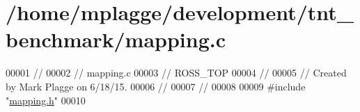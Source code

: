 \hypertarget{mapping_8c_source}{}\section{/home/mplagge/development/tnt\+\_\+benchmark/mapping.c}

\begin{DoxyCode}
00001 \textcolor{comment}{//}
00002 \textcolor{comment}{//  mapping.c}
00003 \textcolor{comment}{//  ROSS\_TOP}
00004 \textcolor{comment}{//}
00005 \textcolor{comment}{//  Created by Mark Plagge on 6/18/15.}
00006 \textcolor{comment}{//}
00007 \textcolor{comment}{//}
00008 
00009 \textcolor{preprocessor}{#include "\hyperlink{mapping_8h}{mapping.h}"}
00010 
\end{DoxyCode}
